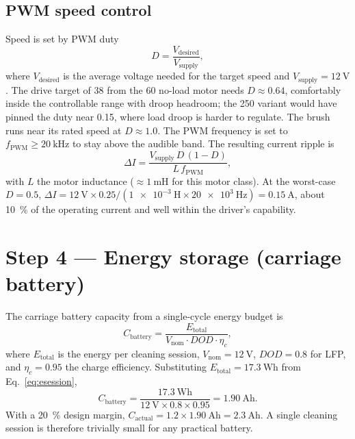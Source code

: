 \documentclass[11pt,a4paper]{article}
\begin{document}
\subsection{PWM speed control}

Speed is set by PWM duty
\begin{equation}
  D = \frac{V_{\text{desired}}}{V_{\text{supply}}},
  \label{eq:duty}
\end{equation}
where $V_{\text{desired}}$ is the average voltage needed for the target speed and
$V_{\text{supply}}=\SI{12}{\volt}$. The drive target of \SI{38}{\rpm} from the
\SI{60}{\rpm} no-load motor needs $D\approx\num{0.64}$, comfortably inside the
controllable range with droop headroom; the \SI{250}{\rpm} variant would have
pinned the duty near \num{0.15}, where load droop is harder to regulate. The
brush runs near its rated speed at $D\approx\num{1.0}$. The PWM frequency is set
to
$f_{\text{PWM}}\geq\SI{20}{\kilo\hertz}$ to stay above the audible band. The
resulting current ripple is
\begin{equation}
  \Delta I = \frac{V_{\text{supply}}\,D\,(1-D)}{L\,f_{\text{PWM}}},
  \label{eq:ripple}
\end{equation}
with $L$ the motor inductance ($\approx\SI{1}{\milli\henry}$ for this motor
class). At the worst-case $D=\num{0.5}$,
$\Delta I = \SI{12}{\volt}\times\num{0.25}/(\SI{1e-3}{\henry}\times\SI{20e3}{\hertz})
= \SI{0.15}{\ampere}$, about \SI{10}{\percent} of the operating current and well
within the driver's capability.

\section{Step 4 --- Energy storage (carriage battery)}
\label{sec:storage}

The carriage battery capacity from a single-cycle energy budget is
\begin{equation}
  C_{\text{battery}} = \frac{E_{\text{total}}}{V_{\text{nom}}\cdot DOD\cdot\eta_{c}},
  \label{eq:batt}
\end{equation}
where $E_{\text{total}}$ is the energy per cleaning session, $V_{\text{nom}}=
\SI{12}{\volt}$, $DOD=\num{0.8}$ for LFP, and $\eta_{c}=\num{0.95}$ the charge
efficiency. Substituting $E_{\text{total}}=\SI{17.3}{\watt\hour}$ from
Eq.~\eqref{eq:esession},
\begin{equation}
  C_{\text{battery}} = \frac{\SI{17.3}{\watt\hour}}{\SI{12}{\volt}\times\num{0.8}\times\num{0.95}}
  = \SI{1.90}{\ampere\hour}.
  \label{eq:batt_num}
\end{equation}
With a \SI{20}{\percent} design margin, $C_{\text{actual}}=\num{1.2}\times
\SI{1.90}{\ampere\hour}=\SI{2.3}{\ampere\hour}$. A single cleaning session is
therefore trivially small for any practical battery.
\end{document}
